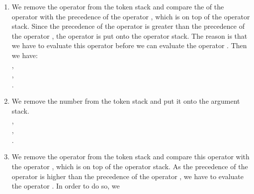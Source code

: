 \begin{enumerate}
      \hspace*{1.3cm} , \\[0.2cm]
      \hspace*{1.3cm} . 
\item We remove the operator  from the  token stack and compare the
       of the operator  with the precedence of the operator
      , which is on top of the operator stack.  Since the precedence of the operator 
       is greater than the precedence of the operator 
      , the operator  is put onto
      the operator stack.  The reason is that we have to evaluate this operator before we can
      evaluate the operator .  Then we have: 
      \\[0.2cm]
      \hspace*{1.3cm} , \\[0.2cm]
      \hspace*{1.3cm} , \\[0.2cm]
      \hspace*{1.3cm} . 
\item We remove the number  from the  token stack and put it onto the argument stack.
      \\[0.2cm]
      \hspace*{1.3cm} , \\[0.2cm]
      \hspace*{1.3cm} , \\[0.2cm]
      \hspace*{1.3cm} . 
\item We remove the operator  from the token stack and
      compare this operator with the operator , which is on top of
      the operator stack.  As the precedence of the  operator  is
      higher than the precedence of the operator ,
      we have to evaluate the operator .  In order to do so, we

\end{enumerate}
